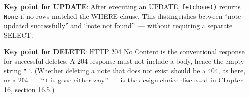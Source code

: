 \noindent{}\textbf{Key point for UPDATE}: After executing an UPDATE, \texttt{fetchone()} returns \texttt{None} if no rows matched the WHERE clause. This distinguishes between ``note updated successfully'' and ``note not found''~--- without requiring a separate SELECT.

\begin{codebox}[short]

\begin{Shaded}
\begin{Highlighting}[]
\NormalTok{(}\OperatorTok{=}\NormalTok{[}\NormalTok{])}
\NormalTok{):}
\OperatorTok{=}
\OperatorTok{=}

    \OperatorTok{==} \NormalTok{:}
        \NormalTok{: }\SpecialCharTok{\{}\SpecialCharTok{\}}\NormalTok{\}), }


     \NormalTok{, }
\end{Highlighting}
\end{Shaded}

\end{codebox}

\noindent{}\textbf{Key point for DELETE}: HTTP 204 No Content is the conventional response for successful deletes. A 204 response must not include a body, hence the empty string \texttt{""}. (Whether deleting a note that does not exist should be a 404, as here, or a 204~--- ``it is gone either way''~--- is the design choice discussed in Chapter 16, section 16.5.)

